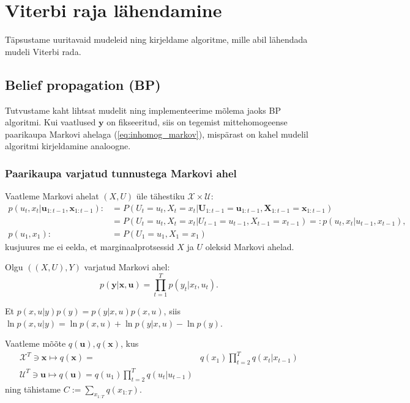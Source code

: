 \section{Viterbi raja lähendamine}

Täpsustame uuritavaid mudeleid ning kirjeldame algoritme, mille abil lähendada mudeli Viterbi rada.

\subsection{Belief propagation (BP)}

Tutvustame kaht lihtsat mudelit ning implementeerime mõlema jaoks BP algoritmi. Kui vaatlused $\mathbf{y}$ on fikseeritud, siis on tegemist mittehomogeense paarikaupa Markovi ahelaga (\ref{eq:inhomog_markov}), mispärast on kahel mudelil algoritmi kirjeldamine analoogne.

\subsubsection{Paarikaupa varjatud tunnustega Markovi ahel}

Vaatleme Markovi ahelat $(X,U)$ üle tähestiku $\mathcal{X} \times \mathcal{U}$:
\begin{align}
    \label{eq:model1_1}
    p(u_{t}, x_{t} | \bm{u}_{1:t-1}, \bm{x}_{1:t-1} ) :&= P(U_{t} = u_{t}, X_{t} = x_{t} | \bm{U}_{1:t-1} = \bm{u}_{1:t-1}, \bm{X}_{1:t-1}=\bm{x}_{1:t-1}) \\
    \nonumber
    &= P(U_{t} = u_{t}, X_{t} = x_{t} | U_{t-1} = u_{t-1}, X_{t-1}=x_{t-1}) =: p(u_{t}, x_{t} | u_{t-1}, x_{t-1} ), \\
    \label{eq:model1_2}
    p(u_1,x_1) :&= P(U_1 = u_1, X_1 = x_1)
\end{align}
kusjuures me ei eelda, et marginaalprotsessid $X$ ja $U$ oleksid Markovi ahelad.

Olgu $((X,U),Y)$ varjatud Markovi ahel:
\begin{equation}
    \label{eq:model1_3}
    p(\bm{y} | \bm{x}, \bm{u}) = \prod_{t=1}^T p(y_t | x_t, u_t).
\end{equation}

Et $p(x,u|y) p(y) = p(y | x,u) p(x,u)$, siis $\ln p(x,u|y) = \ln p(x,u) + \ln p(y | x,u) - \ln p(y)$.

Vaatleme mõõte $q(\bm{u}), q(\bm{x})$, kus
\begin{align*}
    \mathcal{X}^T \ni \bm{x} \mapsto q(\bm{x}) =& q(x_1) \prod_{t=2}^T q(x_t | x_{t-1})\\
    \mathcal{U}^T \ni \bm{u} \mapsto q(\bm{u}) = q(u_1) \prod_{t=2}^T q(u_t | u_{t-1})
\end{align*}
ning tähistame $C := \sum_{x_{1:T}} q(x_{1:T}) $.

